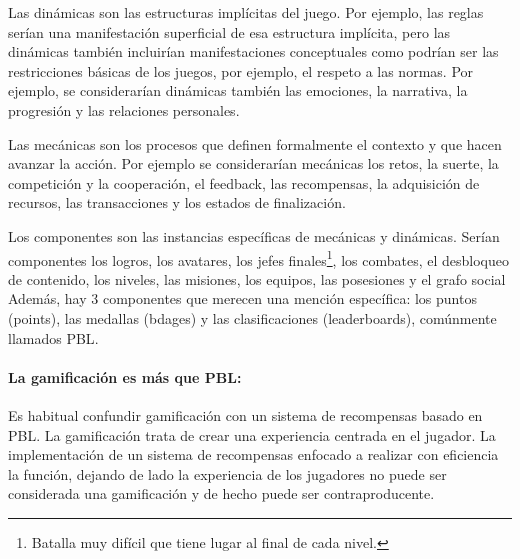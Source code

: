 %
Las dinámicas son las estructuras implícitas del juego. 
%
Por ejemplo, las reglas serían una manifestación superficial de esa estructura implícita, pero las dinámicas también incluirían manifestaciones conceptuales como podrían ser las restricciones básicas de los juegos, por ejemplo, el respeto a las normas.
%
Por ejemplo, se considerarían dinámicas también las emociones, la narrativa, la progresión y las relaciones personales. 

 Las mecánicas son los procesos que definen formalmente el contexto y que hacen avanzar la acción. 
%
Por ejemplo se considerarían mecánicas los retos, la suerte, la competición y la cooperación, el feedback, las recompensas, la adquisición de recursos, las transacciones y los estados de finalización.

 Los componentes son las instancias específicas de mecánicas y dinámicas. 
%
Serían componentes los logros, los avatares, los jefes finales\footnote{Batalla muy difícil que tiene lugar al final de cada nivel.}, los combates, el desbloqueo de contenido, los niveles, las misiones, los equipos, las posesiones y el grafo social 
%
Además, hay 3 componentes que merecen una mención específica: los puntos (points), las medallas (bdages) y las clasificaciones (leaderboards), comúnmente llamados \gls{PBL}.


\paragraph{La gamificación es más que \gls{PBL}:} Es habitual confundir gamificación con un sistema de recompensas basado en \gls{PBL}. 
%
La gamificación trata de crear una experiencia centrada en el jugador. 
%
La implementación de un sistema de recompensas enfocado a realizar con eficiencia la función, dejando de lado la experiencia de los jugadores no puede ser considerada una gamificación y de hecho puede ser contraproducente.

